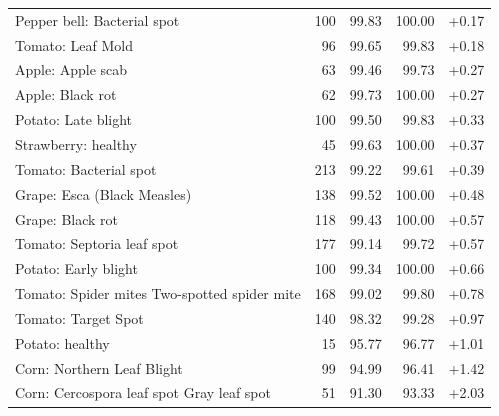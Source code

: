 \begin{table}[!t]
\begin{tabular}{P{0.44\columnwidth}rrrr}
Pepper bell: Bacterial spot & 100 & 99.83 & 100.00 & +0.17 \\
Tomato: Leaf Mold & 96 & 99.65 & 99.83 & +0.18 \\
Apple: Apple scab & 63 & 99.46 & 99.73 & +0.27 \\
Apple: Black rot & 62 & 99.73 & 100.00 & +0.27 \\
Potato: Late blight & 100 & 99.50 & 99.83 & +0.33 \\
Strawberry: healthy & 45 & 99.63 & 100.00 & +0.37 \\
Tomato: Bacterial spot & 213 & 99.22 & 99.61 & +0.39 \\
Grape: Esca (Black Measles) & 138 & 99.52 & 100.00 & +0.48 \\
Grape: Black rot & 118 & 99.43 & 100.00 & +0.57 \\
Tomato: Septoria leaf spot & 177 & 99.14 & 99.72 & +0.57 \\
Potato: Early blight & 100 & 99.34 & 100.00 & +0.66 \\
Tomato: Spider mites Two-spotted spider mite & 168 & 99.02 & 99.80 & +0.78 \\
Tomato: Target Spot & 140 & 98.32 & 99.28 & +0.97 \\
Potato: healthy & 15 & 95.77 & 96.77 & +1.01 \\
Corn: Northern Leaf Blight & 99 & 94.99 & 96.41 & +1.42 \\
Corn: Cercospora leaf spot Gray leaf spot & 51 & 91.30 & 93.33 & +2.03 \\
\bottomrule
\end{tabular}
\end{table}
